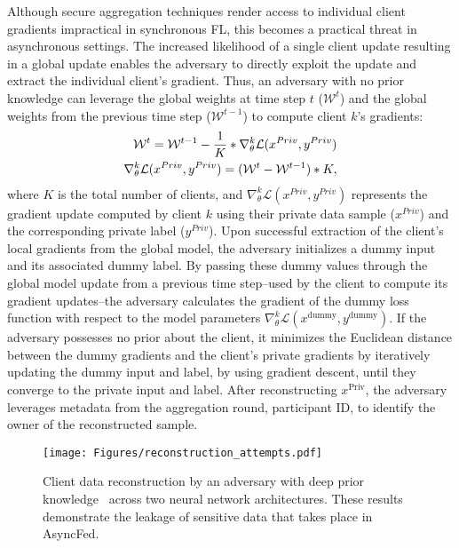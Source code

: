 Although secure aggregation techniques render access to individual client gradients impractical in synchronous FL, this becomes a practical threat in asynchronous settings.
The increased likelihood of a single client update resulting in a global update enables the adversary to directly exploit the update and extract the individual client’s gradient.
Thus, an adversary with no prior knowledge can leverage the global weights at time step $t$ ($\mathcal{W}^{t}$) and the global weights from the previous time step ($\mathcal{W}^{t-1}$) to compute client $k$'s gradients:
\vspace{-0.15in}
\begin{align*}
\mathcal{W}^{t}  = \mathcal{W}^{t-1} -  \frac{1}{K}*\nabla_{\mathcal{\theta}}^k\mathcal{L}(x^{Priv},y^{Priv})
\\
\nabla_{\mathcal{\theta}}^k\mathcal{L}(x^{Priv},y^{Priv}) = (\mathcal{W}^{t} - \mathcal{W}^{t-1})*{K},
\vspace{-0.05in}
\end{align*}
where $K$ is the total number of clients, and $\nabla_{\mathcal{\theta}}^k\mathcal{L}(x^{Priv},y^{Priv})$ represents the gradient update computed by client $k$ using their private data sample ($x^{Priv}$) and the corresponding private label ($y^{Priv}$). 
Upon successful extraction of the client's local gradients from the global model, the adversary initializes a dummy input and its associated dummy label. By passing these dummy values through the global model update from a previous time step--used by the client to compute its gradient updates--the adversary calculates the gradient of the dummy loss function with respect to the model parameters \( \nabla_{\mathcal{\theta}}^k \mathcal{L}(x^{\text{dummy}}, y^{\text{dummy}}) \). If the adversary possesses no prior about the client, it minimizes the Euclidean distance between the dummy gradients and the client's private gradients by iteratively updating the dummy input and label, by using gradient descent, until they converge to the private input and label. After reconstructing \( x^{\text{Priv}} \), the adversary leverages metadata from the aggregation round, \eg participant ID, to identify the owner of the reconstructed sample.
\begin{figure}[t]
\centering
  \texttt{[image: Figures/reconstruction\_attempts.pdf]} 
  \vspace{-0.15in}
  \caption{Client data reconstruction by an adversary with deep prior knowledge~\cite{gradientObfuscation} across two neural network architectures. These results demonstrate the leakage of sensitive data that takes place in AsyncFed.}
  \label{fig:deep_prior_reconstruction} 
  \vspace{-0.25in}
\end{figure}

